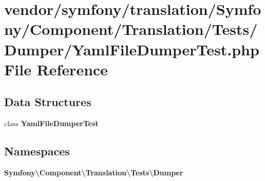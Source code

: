 \section{vendor/symfony/translation/\+Symfony/\+Component/\+Translation/\+Tests/\+Dumper/\+Yaml\+File\+Dumper\+Test.php File Reference}
\label{_yaml_file_dumper_test_8php}
\subsection*{Data Structures}
\begin{DoxyCompactItemize}
\item 
class {\bf Yaml\+File\+Dumper\+Test}
\end{DoxyCompactItemize}
\subsection*{Namespaces}
\begin{DoxyCompactItemize}
\item 
 {\bf Symfony\textbackslash{}\+Component\textbackslash{}\+Translation\textbackslash{}\+Tests\textbackslash{}\+Dumper}
\end{DoxyCompactItemize}
